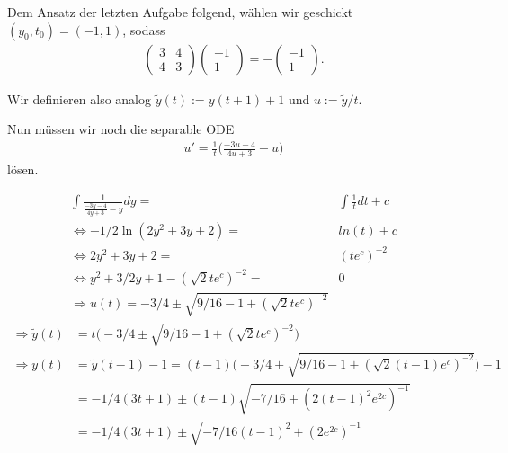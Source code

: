 \begin{solution}
  Dem Ansatz der letzten Aufgabe folgend, wählen wir geschickt $(y_0,t_0) = (-1,1)$, sodass
 \begin{align*}
  \begin{pmatrix}
    3 & 4 \\ 4 & 3
  \end{pmatrix}\left(
  \begin{array}{c}
    -1 \\
    1
  \end{array}
  \right) = -\left(
  \begin{array}{c}
    -1 \\
    1
  \end{array}
  \right).
  \end{align*}

  Wir definieren also analog $\tilde{y}(t) := y(t+1)+1$ und $u := \tilde{y}/t$.

  Nun müssen wir noch die separable ODE
  \begin{align*}
    u' = \frac{1}{t} \bigg(\frac{-3 u -4}{4u+3}-u\bigg)
  \end{align*}
  lösen.

  \begin{align*}
    \int \frac{1}{\frac{-3y-4}{4y+3}-y}dy =& \int \frac{1}{t} dt + c \\
    \Leftrightarrow -1/2 \ln(2y^2 +3y + 2) =& ln(t) + c \\
    \Leftrightarrow 2y^2 +3y + 2 =& (te^c)^{-2} \\
    \Leftrightarrow y^2 +3/2y + 1 - (\sqrt{2} te^c)^{-2} =& 0 \\
    \Rightarrow u(t) = -3/4 \pm \sqrt{9/16 - 1 + (\sqrt{2} te^c)^{-2}}
  \end{align*}
  \begin{align*}
    \Rightarrow \tilde{y}(t) &= t \bigg(-3/4 \pm \sqrt{9/16 - 1 + (\sqrt{2} te^c)^{-2}}\bigg) \\
    \Rightarrow y(t) &= \tilde{y}(t-1) -1 = (t-1) \bigg(-3/4 \pm \sqrt{9/16 - 1 + (\sqrt{2} (t-1)e^c)^{-2}}\bigg) - 1 \\
    &= -1/4 (3t+1) \pm (t-1) \sqrt{-7/16 + (2 (t-1)^2 e^{2c})^{-1}} \\
    &= -1/4 (3t+1) \pm \sqrt{-7/16(t-1)^2 + (2e^{2c})^{-1}}
  \end{align*}
\end{solution}
